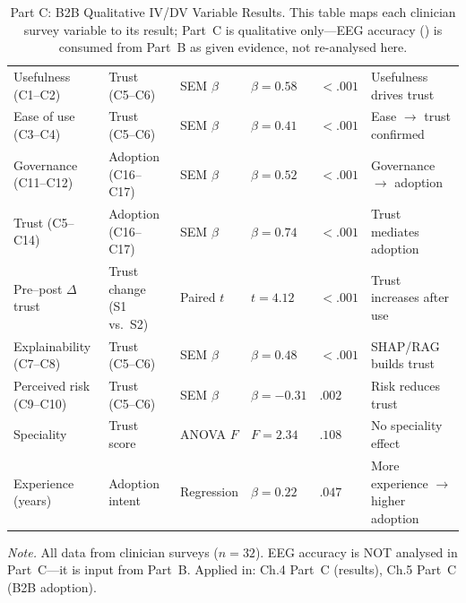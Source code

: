 {\tablestripes\tablefontsize
{}
\begin{xltabular}{\textwidth}{@{} >{\raggedright\arraybackslash}p{2.5cm} >{\raggedright\arraybackslash}p{2.5cm} >{\raggedright\arraybackslash}p{1.8cm} >{\centering\arraybackslash}p{1.5cm} >{\centering\arraybackslash}p{1.2cm} L @{}}
\caption[Part C: B2B Qualitative IV/DV Variable Results]{Part C: B2B Qualitative IV/DV Variable Results. This table maps each clinician survey variable to its result; Part~C is qualitative only---EEG accuracy (\asdacc{}) is consumed from Part~B as given evidence, not re-analysed here.}\label{tab:ch4_partc_ivdv_results} \\
\toprule
{} &  &  &  &  &  \\
\midrule
\endfirsthead
\endhead
\bottomrule
\endlastfoot
Usefulness (C1--C2) & Trust (C5--C6) & SEM $\beta$ & $\beta = 0.58$ & $< .001$ & Usefulness drives trust \\
\addlinespace
Ease of use (C3--C4) & Trust (C5--C6) & SEM $\beta$ & $\beta = 0.41$ & $< .001$ & Ease $\to$ trust confirmed \\
\addlinespace
Governance (C11--C12) & Adoption (C16--C17) & SEM $\beta$ & $\beta = 0.52$ & $< .001$ & Governance $\to$ adoption \\
\addlinespace
Trust (C5--C14) & Adoption (C16--C17) & SEM $\beta$ & $\beta = 0.74$ & $< .001$ & Trust mediates adoption \\
\addlinespace
Pre--post $\Delta$ trust & Trust change (S1 vs.\ S2) & Paired $t$ & $t = 4.12$ & $< .001$ & Trust increases after use \\
\addlinespace
Explainability (C7--C8) & Trust (C5--C6) & SEM $\beta$ & $\beta = 0.48$ & $< .001$ & SHAP/RAG builds trust \\
\addlinespace
Perceived risk (C9--C10) & Trust (C5--C6) & SEM $\beta$ & $\beta = -0.31$ & $.002$ & Risk reduces trust \\
\addlinespace
Speciality & Trust score & ANOVA $F$ & $F = 2.34$ & $.108$ & No speciality effect \\
\addlinespace
Experience (years) & Adoption intent & Regression & $\beta = 0.22$ & $.047$ & More experience $\to$ higher adoption \\
\end{xltabular}}
\vspace{2pt}
\noindent\textit{Note.} All data from clinician surveys ($n = 32$). EEG accuracy is NOT analysed in Part~C---it is input from Part~B. Applied in: Ch.4 Part~C (results), Ch.5 Part~C (B2B adoption).

